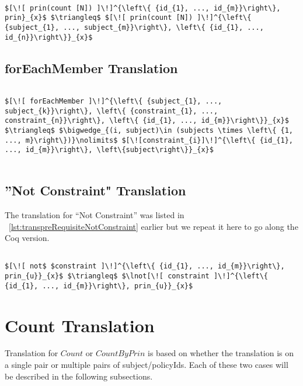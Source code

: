 \lstset{mathescape, language=AST}  
\begin{lstlisting}[frame=single, caption={Constraint Translation {$\colon$} Count by Principal},label={lst:transconstraintCountbyPrin}]

$[\![ prin(count [N]) ]\!]^{\left\{ {id_{1}, ..., id_{m}}\right\}, prin}_{x}$ $\triangleq$ $[\![ prin(count [N]) ]\!]^{\left\{ {subject_{1}, ..., subject_{m}}\right\}, \left\{ {id_{1}, ..., id_{n}}\right\}}_{x}$ 
\end{lstlisting}


\subsection{forEachMember Translation}

\lstset{mathescape, language=AST}  
\begin{lstlisting}[frame=single, caption={ForEachMember Translation {$\colon$} Count by Principal},label={lst:transforEachMember}]

$[\![ forEachMember ]\!]^{\left\{ {subject_{1}, ..., subject_{k}}\right\}, \left\{ {constraint_{1}, ..., constraint_{n}}\right\}, \left\{ {id_{1}, ..., id_{m}}\right\}}_{x}$ $\triangleq$ $\bigwedge_{(i, subject)\in (subjects \times \left\{ {1, ..., m}\right\})}\nolimits$ $[\![constraint_{i}]\!]^{\left\{ {id_{1}, ..., id_{m}}\right\}, \left\{subject\right\}}_{x}$


\end{lstlisting}

\subsection{''Not Constraint" Translation}

The translation for ``Not Constraint'' was listed in ~\ref{lst:transpreRequisiteNotConstraint} earlier but we repeat it here to go along the Coq version. 

\lstset{mathescape, language=AST}  
\begin{lstlisting}[frame=single, caption={Not Constraint Translation},label={lst:transnotCons}]

$[\![ not$ $constraint ]\!]^{\left\{ {id_{1}, ..., id_{m}}\right\}, prin_{u}}_{x}$ $\triangleq$ $\lnot[\![ constraint ]\!]^{\left\{ {id_{1}, ..., id_{m}}\right\}, prin_{u}}_{x}$ 

\end{lstlisting}

\section{Count Translation}
Translation for $Count$ or $CountByPrin$ is based on whether the translation is on a single pair or multiple pairs of subject/policyIds. Each of these two cases will be described in the following subsections.

